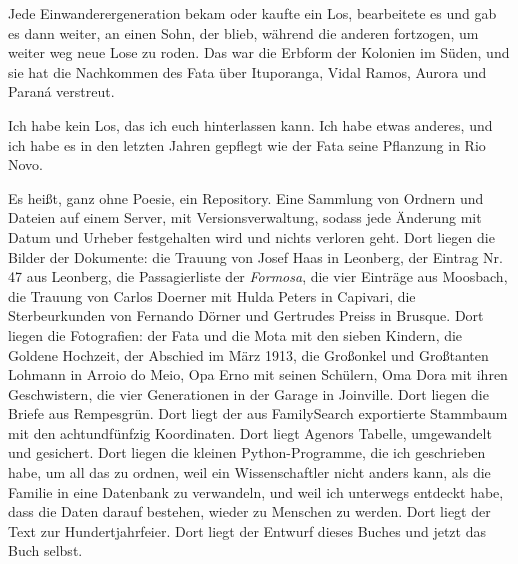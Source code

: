 \documentclass[
  ngerman,
  11pt,
  openany]{book}
\begin{document}
Jede Einwanderergeneration bekam oder kaufte ein Los, bearbeitete es und
gab es dann weiter, an einen Sohn, der blieb, während die anderen
fortzogen, um weiter weg neue Lose zu roden. Das war die Erbform der
Kolonien im Süden, und sie hat die Nachkommen des Fata über Ituporanga,
Vidal Ramos, Aurora und Paraná verstreut.

Ich habe kein Los, das ich euch hinterlassen kann. Ich habe etwas
anderes, und ich habe es in den letzten Jahren gepflegt wie der Fata
seine Pflanzung in Rio Novo.

Es heißt, ganz ohne Poesie, ein Repository. Eine Sammlung von Ordnern
und Dateien auf einem Server, mit Versionsverwaltung, sodass jede
Änderung mit Datum und Urheber festgehalten wird und nichts verloren
geht. Dort liegen die Bilder der Dokumente: die Trauung von Josef Haas
in Leonberg, der Eintrag Nr. 47 aus Leonberg, die Passagierliste der
\emph{Formosa}, die vier Einträge aus Moosbach, die Trauung von Carlos
Doerner mit Hulda Peters in Capivari, die Sterbeurkunden von Fernando
Dörner und Gertrudes Preiss in Brusque. Dort liegen die Fotografien: der
Fata und die Mota mit den sieben Kindern, die Goldene Hochzeit, der
Abschied im März 1913, die Großonkel und Großtanten Lohmann in Arroio do
Meio, Opa Erno mit seinen Schülern, Oma Dora mit ihren Geschwistern, die
vier Generationen in der Garage in Joinville. Dort liegen die Briefe aus
Rempesgrün. Dort liegt der aus FamilySearch exportierte Stammbaum mit
den achtundfünfzig Koordinaten. Dort liegt Agenors Tabelle, umgewandelt
und gesichert. Dort liegen die kleinen Python-Programme, die ich
geschrieben habe, um all das zu ordnen, weil ein Wissenschaftler nicht
anders kann, als die Familie in eine Datenbank zu verwandeln, und weil
ich unterwegs entdeckt habe, dass die Daten darauf bestehen, wieder zu
Menschen zu werden. Dort liegt der Text zur Hundertjahrfeier. Dort liegt
der Entwurf dieses Buches und jetzt das Buch selbst.
\end{document}
